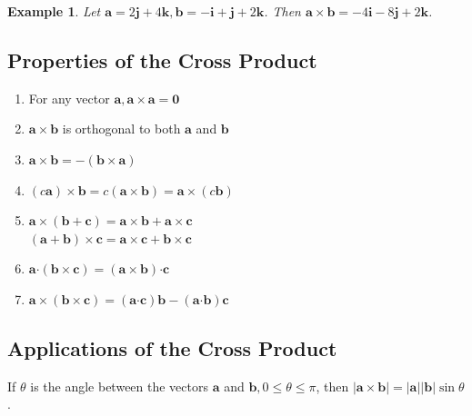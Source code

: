 \documentclass[letterpaper, 11pt, openany]{book}
\newcommand{\scdot}{\boldsymbol{\cdot}}
\theoremstyle{mytheoremstyle}
\theoremstyle{myexamplestyle}
\newtheorem{example}{Example}[section]
\begin{document}
\begin{example}
    Let \(\mathbf{a} = 2\mathbf{j} + 4\mathbf{k}, \mathbf{b} = -\mathbf{i} + \mathbf{j} + 2\mathbf{k}\). Then \(\mathbf{a} \times \mathbf{b} = -4\mathbf{i} - 8 \mathbf{j} + 2\mathbf{k}\).
\end{example}

\subsection{Properties of the Cross Product}
\begin{enumerate}
    \item For any vector \(\mathbf{a}, \mathbf{a} \times \mathbf{a} = \mathbf{0}\)
    \item \(\mathbf{a} \times \mathbf{b}\) is orthogonal to both \(\mathbf{a}\) and \(\mathbf{b}\)
    \item \(\mathbf{a} \times \mathbf{b} = -(\mathbf{b} \times \mathbf{a})\)
    \item \((c\mathbf{a})\times \mathbf{b} = c(\mathbf{a}\times \mathbf{b}) = \mathbf{a} \times (c\mathbf{b})\)
    \item \(\mathbf{a} \times (\mathbf{b}+ \mathbf{c}) = \mathbf{a} \times \mathbf{b} + \mathbf{a} \times \mathbf{c}\) \\
          \((\mathbf{a} + \mathbf{b})\times \mathbf{c} = \mathbf{a} \times \mathbf{c} + \mathbf{b} \times \mathbf{c}\)
    \item \(\mathbf{a}\scdot (\mathbf{b}\times \mathbf{c}) = (\mathbf{a}\times \mathbf{b})\scdot \mathbf{c}\)
    \item \(\mathbf{a}\times (\mathbf{b}\times \mathbf{c}) = (\mathbf{a}\scdot \mathbf{c})\mathbf{b} - (\mathbf{a}\scdot \mathbf{b})\mathbf{c}\)
\end{enumerate}

\subsection{Applications of the Cross Product}

If \(\theta\) is the angle between the vectors \(\mathbf{a}\) and \(\mathbf{b}, 0 \leq \theta \leq \pi\), then \(|\mathbf{a} \times \mathbf{b}| = |\mathbf{a}||\mathbf{b}|\sin \theta\).
\end{document}
